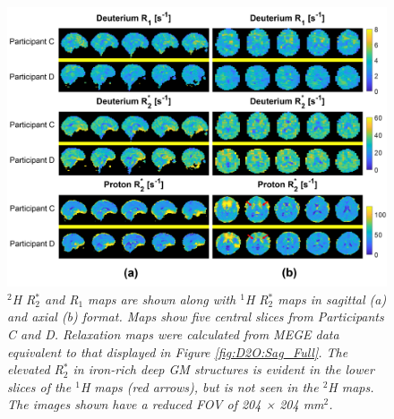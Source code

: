 \documentclass[class=article, crop=false]{standalone}
\begin{document}
\begin{figure}[H]
    \centering
    \includegraphics[width=1\textwidth]{Figures/D2O/R1_R2.png}
    \caption{\textit{$^2$H R$_2^*$ and R$_1$ maps are shown along with $^1$H R$_2^*$ maps in sagittal (a) and axial (b) format. Maps show five central slices from Participants C and D. Relaxation maps were calculated from MEGE data equivalent to that displayed in Figure \ref{fig:D2O:Sag_Full}. The elevated R$_2^*$ in iron-rich deep GM structures is evident in the lower slices of the $^1$H maps (red arrows), but is not seen in the $^2$H maps. The images shown have a reduced FOV of 204 × 204 mm$^2$.}}
    \label{fig:D2O:R1_R2}
\end{figure}

\end{document}
